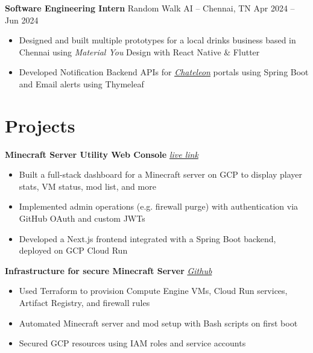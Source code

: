 \documentclass[11pt]{article}       %
\begin{document}
\textbf{Software Engineering Intern} {Random Walk AI} -- Chennai, TN \hfill Apr 2024 -- Jun 2024 \\
\vspace{-9pt}
\begin{itemize}
    \item Designed and built multiple prototypes for a local drinks business
          based in Chennai using \textit{Material You} Design with React Native \& Flutter
    \item Developed Notification Backend APIs for
        \textit{\href{https://chateleon.com}{\underline{Chateleon}}} portals using Spring Boot and
        Email alerts using Thymeleaf
\end{itemize}


\vspace{-18.5pt}
\section*{Projects}

\textbf{Minecraft Server Utility Web Console} \hfill \href{https://mccon.arhm.dev}{\textit{live link}} \\
\vspace{-9pt}
\begin{itemize}
    \item{Built a full-stack dashboard for a Minecraft server on GCP to display player stats, VM status, mod list, and more}
    \item{Implemented admin operations (e.g. firewall purge) with authentication via GitHub OAuth and custom JWTs}
    \item{Developed a Next.js frontend integrated with a Spring Boot backend, deployed on GCP Cloud Run}
\end{itemize}   

\textbf{Infrastructure for secure Minecraft Server} \hfill \href{https://github.com/apparentlyarhm/minecraft-terraform}{\textit{Github}} \\
\vspace{-9pt}
\begin{itemize}
    \item{Used Terraform to provision Compute Engine VMs, Cloud Run services, Artifact Registry, and firewall rules}
    \item{Automated Minecraft server and mod setup with Bash scripts on first boot}
    \item{Secured GCP resources using IAM roles and service accounts}
    \end{itemize}
\end{document}
